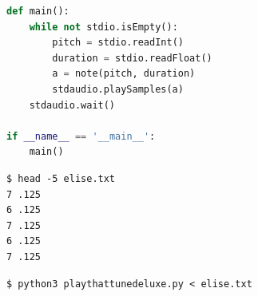 \documentclass[8pt,a4paper,compress]{beamer}
\begin{document}
\begin{frame}[fragile]
\pause

\begin{lstlisting}[language=Python]
def main():
    while not stdio.isEmpty():
        pitch = stdio.readInt()
        duration = stdio.readFloat()
        a = note(pitch, duration)
        stdaudio.playSamples(a)
    stdaudio.wait()

if __name__ == '__main__':
    main()
\end{lstlisting}

\pause

\begin{minipage}{170pt}
\begin{lstlisting}[language={}]
$ head -5 elise.txt
7 .125 
6 .125 
7 .125 
6 .125 
7 .125 
\end{lstlisting}

\pause

\begin{lstlisting}[language={}]
$ python3 playthattunedeluxe.py < elise.txt
\end{lstlisting}
\end{minipage}%
\begin{minipage}{130pt}
\hfill {}
\end{minipage}
\end{frame}
\end{document}

